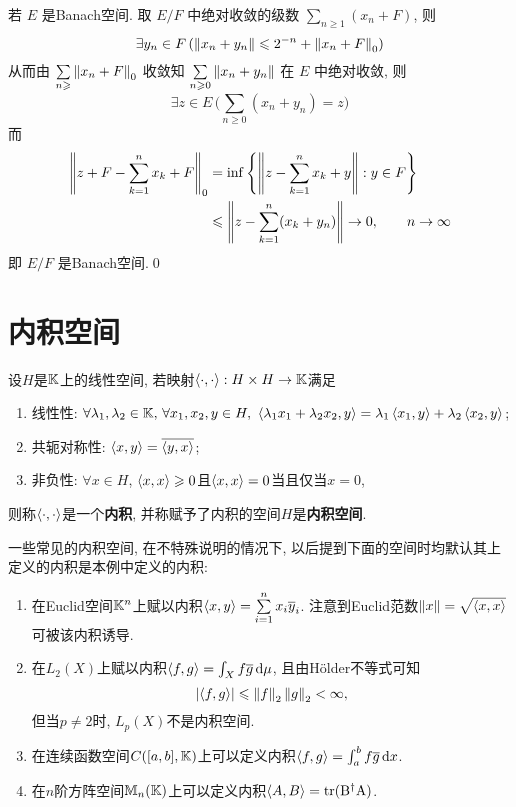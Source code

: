 \begin{Proof}
        若 $ E $ 是Banach空间. 取 $ E/F $ 中绝对收敛的级数 $ \sum\limits_{n\geqslant1}(x_{n}+F) $, 则
        \[
            \exists y_{n}\in F\,(\left\| x_{n}+y_{n} \right\|\leqslant 2^{-n}+\left\| x_{n}+F \right\|_{0})
        \]
        从而由 $ \sum\limits_{n\geqslant}\left\| x_{n}+F \right\|_{0} $ 收敛知 $ \sum\limits_{n\geqslant0}\left\| x_{n}+y_{n} \right\| $ 在 $ E $ 中绝对收敛, 则
        \[
            \exists z\in E\,\bigg( \sum_{n\geqslant0}(x_{n}+y_{n})=z \bigg)
        \]
        而
        \[
            \begin{aligned}
                \left\| z+F-\sum_{k=1}^{n}x_{k}+F \right\|_{0} & =\inf\left\{ \left\| z-\sum_{k=1}^{n}x_{k}+y \right\|:y\in F \right\}\\
                & \leqslant \left\| z-\sum_{k=1}^{n}(x_{k}+y_{n}) \right\|\to 0,\qquad n\to\infty
            \end{aligned}
        \]
        即 $ E/F $ 是Banach空间.\qed
    \end{Proof}

\section{内积空间}

    \begin{Definition}[内积空间]
    设$ H $是$ \mathbb{K} $上的线性空间, 若映射$ \left\langle \cdot,\cdot \right\rangle : H\times H\to\mathbb{K} $满足
    \begin{enumerate}[(1)]
    \item 线性性: $ \forall \lambda_1,\lambda_2\in\K,\,\forall x_1,x_2,y\in H,\ \lrangle{\lambda_1x_1+\lambda_2x_2,y}=\lambda_1\lrangle{x_1,y}+\lambda_2\lrangle{x_2,y} $;
    \item 共轭对称性: $ \left\langle x,y \right\rangle=\overline{\left\langle y,x \right\rangle} $;
    \item 非负性: $ \forall x\in H $, $ \left\langle x,x \right\rangle\geqslant 0 $且$ \left\langle x,x \right\rangle=0 $当且仅当$ x=0 $,
    \end{enumerate}
    则称$ \left\langle \cdot,\cdot \right\rangle $是一个\textbf{内积}, 并称赋予了内积的空间$ H $是\textbf{内积空间}.
    \end{Definition}

    \begin{Example}
    一些常见的内积空间, 在不特殊说明的情况下, 以后提到下面的空间时均默认其上定义的内积是本例中定义的内积:
    \begin{enumerate}[(1)]
    \item 在Euclid空间$ \mathbb{K}^n $上赋以内积$ \left\langle x,y \right\rangle=\sum\limits_{i=1}^nx_i\overline{y}_i $. 注意到Euclid范数$ \left\| x \right\|=\sqrt{\left\langle x,x \right\rangle} $可被该内积诱导.
    \item 在$ L_2(X) $上赋以内积$ \left\langle f,g \right\rangle=\int_Xf\overline{g}\,\mathrm{d}\mu $, 且由H\"older不等式可知
    \[
    \left| \left\langle f,g \right\rangle \right| \leqslant\left\| f \right\|_2\left\| g \right\|_2<\infty,
    \]
    但当$ p\ne 2 $时, $ L_p(X) $不是内积空间.
    \item 在连续函数空间$ C([a,b],\mathbb{K}) $上可以定义内积$ \left\langle f,g \right\rangle=\int_a^bf\overline{g}\,\mathrm{d} x $.
    \item 在$ n $阶方阵空间$ \mathbb{M}_n(\mathbb{K}) $上可以定义内积$ \left\langle A,B \right\rangle=\mathrm{tr(B^\dagger A)} $.
    \end{enumerate}
    \end{Example}

